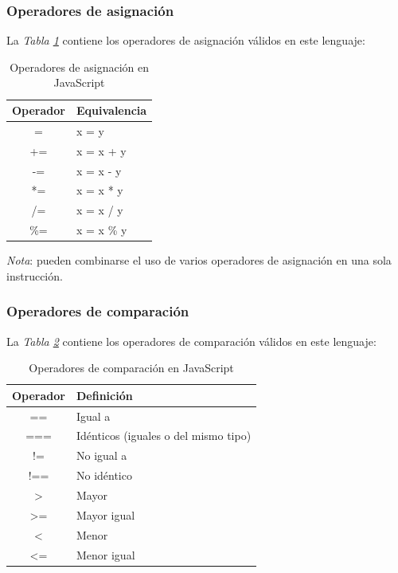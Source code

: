 \subsubsection{Operadores de asignación}
\hspace{0.55cm}La \textit{Tabla \ref{tab: 3}} contiene los operadores de asignación válidos en este lenguaje:
\begin{table}[H]
    \begin{center}
        \caption{Operadores de asignación en JavaScript}
        \label{tab: 3}
        \begin{tabular}{c l}
            \hline
            \textbf{Operador}&\textbf{Equivalencia} \\
            \hline
            = & x = y \\
            += & x = x + y \\
            -= & x = x - y \\
            *= & x = x * y \\
            /= & x = x / y \\
            \%= & x = x \% y \\
            \hline
        \end{tabular}
    \end{center}
\end{table}

\textit{Nota}: pueden combinarse el uso de varios operadores de asignación en una sola instrucción.


\subsubsection{Operadores de comparación}
\hspace{0.55cm}La \textit{Tabla \ref{tab: 4}} contiene los operadores de comparación válidos en este lenguaje:
\begin{table}[H]
    \begin{center}
        \caption{Operadores de comparación en JavaScript}
        \label{tab: 4}
        \begin{tabular}{c l}
            \hline
            \textbf{Operador}&\textbf{Definición} \\
            \hline
            == & Igual a \\
            === & Idénticos (iguales o del mismo tipo) \\
            != & No igual a \\
            !== & No idéntico \\
            > & Mayor \\
            >= & Mayor igual \\
            < & Menor \\
            <= & Menor igual \\
            \hline
        \end{tabular}
    \end{center}
\end{table}

